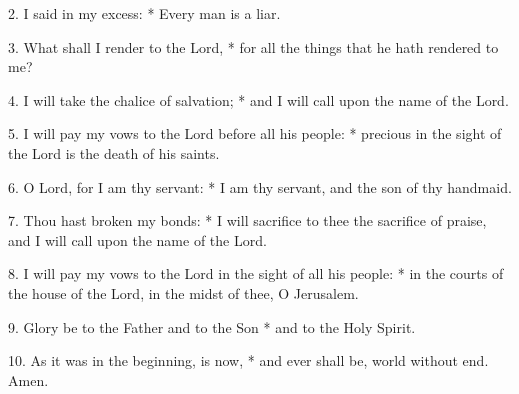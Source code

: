 
2. I said in my excess: * Every man is a liar.

3. What shall I render to the Lord, * for all the things that he hath rendered to me?

4. I will take the chalice of salvation; * and I will call upon the name of the Lord.

5.  I will pay my vows to the Lord before all his people: * precious in the sight of the Lord is the death of his saints.

6.  O Lord, for I am thy servant: * I am thy servant, and the son of thy handmaid.

7. Thou hast broken my bonds: * I will sacrifice to thee the sacrifice of praise, and I will call upon the name of the Lord.

8.  I will pay my vows to the Lord in the sight of all his people: * in the courts of the house of the Lord, in the midst of thee, O Jerusalem.

9. Glory be to the Father and to the Son * and to the Holy Spirit.

10. As it was in the beginning, is now, * and ever shall be, world without end. Amen.